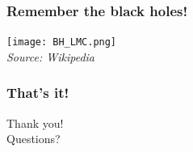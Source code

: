 \documentclass{beamer}
\begin{document}
\addtocounter{page}{1}
\begin{frame}
\addtocounter{page}{-1}
\frametitle{Remember the black holes!}

\pause
\begin{center}
\texttt{[image: BH\_LMC.png]}%
\\
\textit{\footnotesize{Source: Wikipedia}}
\end{center}

\end{frame}



\addtocounter{page}{1}
\begin{frame}
\addtocounter{page}{-1}
\frametitle{That's it!}
\begin{center}
Thank you!\\
Questions?
\end{center}
\end{frame}



%
\end{document}
